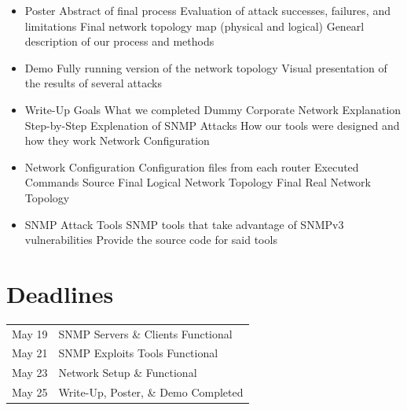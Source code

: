 \documentclass[pdftex, 11pt]{article}
\begin{document}
\begin{itemize}
\item Poster
  \subitem Abstract of final process
  \subitem Evaluation of attack successes, failures, and limitations
  \subitem Final network topology map (physical and logical)
  \subitem Genearl description of our process and methods

\item Demo
  \subitem Fully running version of the network topology %
  \subitem Visual presentation of the results of several attacks

\item Write-Up
  \subitem Goals
  \subitem What we completed
  \subitem Dummy Corporate Network Explanation
  \subitem Step-by-Step Explenation of SNMP Attacks
  \subitem How our tools were designed and how they work
  \subitem Network Configuration

\item Network Configuration
  \subitem Configuration files from each router
  \subitem Executed Commands Source
  \subitem Final Logical Network Topology
  \subitem Final Real Network Topology

\item SNMP Attack Tools
  \subitem SNMP tools that take advantage of SNMPv3  vulnerabilities
  \subitem Provide the source code for said tools

\end{itemize}

\section{Deadlines}

\begin{center}
\begin{tabular}{l l}
  May 19 & SNMP Servers \& Clients Functional \\
  May 21 & SNMP Exploits Tools Functional \\
  May 23 & Network Setup \& Functional \\
  May 25 & Write-Up, Poster, \& Demo Completed \\
\end{tabular}
\end{center}
\end{document}
